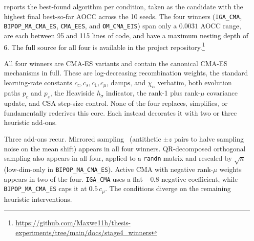  reports the best-found algorithm per condition, taken as the candidate with the highest final best-so-far AOCC across the 10 seeds. The four winners (\texttt{IGA\_CMA}, \texttt{BIPOP\_MA\_CMA\_ES}, \texttt{CMA\_EES}, and \texttt{OM\_CMA\_EIS}) span only a $0.0031$ AOCC range, are each between 95 and 115 lines of code, and have a maximum nesting depth of 6. The full source for all four is available in the project repository.\footnote{\url{https://github.com/Maxwe11h/thesis-experiments/tree/main/docs/stage4_winners}}

All four winners are CMA-ES \cite{hansen2001cmaes} variants and contain the canonical CMA-ES mechanisms in full. These are log-decreasing recombination weights, the standard learning-rate constants $c_c, c_s, c_1, c_\mu$, $\text{damps}$, and $\chi_n$ verbatim, both evolution paths $p_c$ and $p_s$, the Heaviside $h_\sigma$ indicator, the rank-1 plus rank-$\mu$ covariance update, and CSA step-size control. None of the four replaces, simplifies, or fundamentally rederives this core. Each instead decorates it with two or three heuristic add-ons.

Three add-ons recur. Mirrored sampling~\cite{mirrored2010} (antithetic $\pm z$ pairs to halve sampling noise on the mean shift) appears in all four winners. QR-decomposed orthogonal sampling also appears in all four, applied to a \texttt{randn} matrix and rescaled by $\sqrt{n}$ (low-dim-only in \texttt{BIPOP\_MA\_CMA\_ES}). Active CMA with negative rank-$\mu$ weights~\cite{active2006} appears in two of the four. \texttt{IGA\_CMA} uses a flat $-0.8$ negative coefficient, while \texttt{BIPOP\_MA\_CMA\_ES} caps it at $0.5\,c_\mu$. The conditions diverge on the remaining heuristic interventions.

